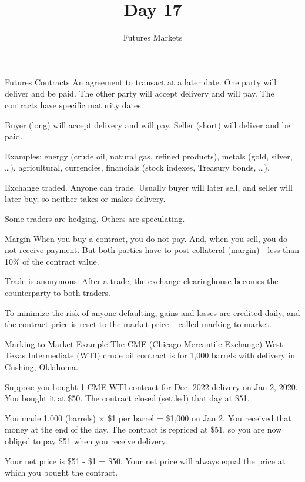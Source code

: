 \documentclass[xcolor=dvipsnames,10pt]{beamer}
\begin{document}
\title{\vskip 0.5in Day 17}
\subtitle{Futures Markets}

\begin{frame}
  \titlepage
\end{frame}

\begin{frame}{Futures Contracts}
    An agreement to transact at a later date.  One party will deliver and be paid.  The other party will accept delivery and will pay.  The contracts have specific maturity dates.
    
    Buyer (long) will accept delivery and will pay.  Seller (short) will deliver and be paid.
    
    Examples: energy (crude oil, natural gas, refined products), metals (gold, silver, \ldots), agricultural, currencies, financials (stock indexes, Treasury bonds, \ldots).
    
    Exchange traded.  Anyone can trade.  Usually buyer will later sell, and seller will later buy, so neither takes or makes delivery.
    
    Some traders are hedging.  Others are speculating.
\end{frame}

\begin{frame}{Margin}
When you buy a contract, you do not pay.  And, when you sell, you do not receive payment.  But both parties have to post collateral (margin) - less than 10\% of the contract value.

Trade is anonymous.  After a trade, the exchange clearinghouse becomes the counterparty to both traders.  

To minimize the risk of anyone defaulting, gains and losses are credited daily, and the contract price is reset to the market price -- called marking to market.
\end{frame}

\begin{frame}{Marking to Market Example}
The CME (Chicago Mercantile Exchange) West Texas Intermediate (WTI) crude oil contract is for 1,000 barrels with delivery in Cushing, Oklahoma.

Suppose you bought 1 CME WTI contract for Dec, 2022 delivery on Jan 2, 2020.  You bought it at \$50.  The contract closed (settled) that day at \$51.
    
You made 1,000 (barrels) $\times$ \$1 per barrel = \$1,000 on Jan 2.  You received that money at the end of the day.  The contract is repriced at \$51, so you are now obliged to pay \$51 when you receive delivery.

Your net price is \$51 - \$1 = \$50.  Your net price will always equal the price at which you bought the contract.
\end{frame}
\end{document}
